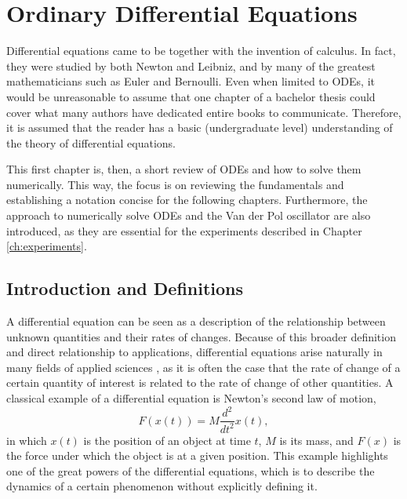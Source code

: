 \chapter{Ordinary Differential Equations}\label{ch:ode}

Differential equations came to be together with the invention of calculus.
In fact, they were studied by both Newton and Leibniz, and by many of the greatest mathematicians such as Euler and Bernoulli.
Even when limited to \gls{ODE}s, it would be unreasonable to assume that one chapter of a bachelor thesis could cover what many authors have dedicated entire books to communicate.
Therefore, it is assumed that the reader has a basic (undergraduate level) understanding of the theory of differential equations\footnotemark.

This first chapter is, then, a short review of \gls{ODE}s and how to solve them numerically.
This way, the focus is on reviewing the fundamentals and establishing a notation concise for the following chapters.
Furthermore, the approach to numerically solve \gls{ODE}s and the Van der Pol oscillator are also introduced, as they are essential for the experiments described in Chapter \ref{ch:experiments}.

\section{Introduction and Definitions}

A differential equation can be seen as a description of the relationship between unknown quantities and their rates of changes.
Because of this broader definition and direct relationship to applications, differential equations arise naturally in many fields of applied sciences \cite{hairer_solving_1993}, as it is often the case that the rate of change of a certain quantity of interest is related to the rate of change of other quantities.
A classical example of a differential equation is Newton's second law of motion, 
\begin{equation}
   F\left( x\left( t \right) \right) = M \frac{d^2}{d t^2} x(t) \label{eq:newton}
,\end{equation}
in which $x\left( t \right) $ is the position of an object at time $t$, $M$ is its mass, and $F(x)$ is the force under which the object is at a given position.
This example highlights one of the great powers of the differential equations, which is to describe the dynamics of a certain phenomenon without explicitly defining it.



